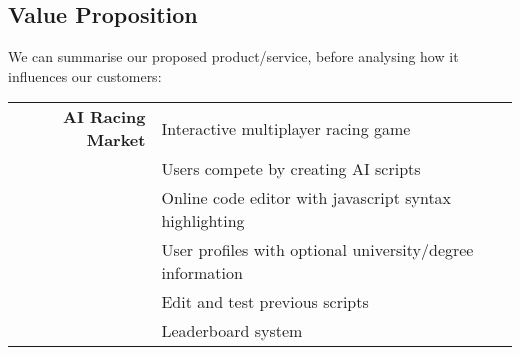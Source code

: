 \subsection{Value Proposition}
We can summarise our proposed product/service, before analysing how it influences our customers: 
\\[+1em]
\begin{tabular}{ r | l}
{\bf AI Racing Market} & Interactive multiplayer racing game \\
				   & Users compete by creating AI scripts\\
				   & Online code editor with javascript syntax highlighting \\
				   & User profiles with optional university/degree information \\
				   & Edit and test previous scripts \\
				   & Leaderboard system
\end{tabular} 
\\[+2em]

